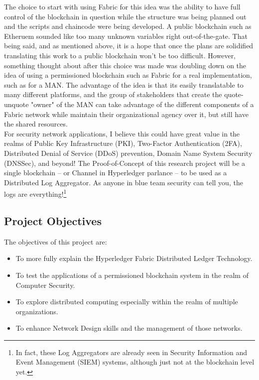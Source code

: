 		\hspace{10mm}The choice to start with using Fabric for this idea was the ability to have full control of the blockchain in question while the structure was being planned out and the scripts and chaincode were being developed. A public blockchain such as Etheruem sounded like too many unknown variables right out-of-the-gate. That being said, and as mentioned above, it is a hope that once the plans are solidified translating this work to a public blockchain won't be too difficult. However, something thought about after this choice was made was doubling down on the idea of using a permissioned blockchain such as Fabric for a real implementation, such as for a MAN. The advantage of the idea is that its easily translatable to many different platforms, and the group of stakeholders that create the quote-unquote "owner" of the MAN can take advantage of the different components of a Fabric network while maintain their organizational agency over it, but still have the shared resources.\\
		
		\hspace{10mm}For security network applications, I believe this could have great value in the realms of Public Key Infrastructure (PKI), Two-Factor Authentication (2FA), Distributed Denial of Service (DDoS) prevention, Domain Name System Security (DNSSec), and beyond! The Proof-of-Concept of this research project will be a single blockchain -- or Channel in Hyperledger parlance -- to be used as a Distributed Log Aggregator. As anyone in blue team security can tell you, the logs are everything!\footnote{In fact, these Log Aggregators are already seen in Security Information and Event Management (SIEM) systems, although just not at the blockchain level yet.}\\
	
	\subsection{Project Objectives}
		\hspace{10mm}The objectives of this project are:
		\begin{itemize}
			\item To more fully explain the Hyperledger Fabric Distributed Ledger Technology.
			\item To test the applications of a permissioned blockchain system in the realm of Computer Security.
			\item To explore distributed computing especially within the realm of multiple organizations.
			\item To enhance Network Design skills and the management of those networks.
		\end{itemize}
		
